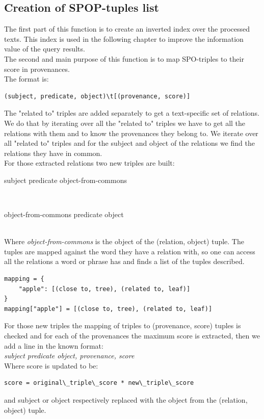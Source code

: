 \subsection{Creation of SPOP-tuples list}
\label{sec:relationmapping}
The first part of this function is to create an inverted index over the processed texts. This index is used in the following chapter to improve the information value of the query results.\\
The second and main purpose of this function is to map SPO-triples to their score in provenances.\\
The format is:
\begin{lstlisting}
(subject, predicate, object)\t[(provenance, score)]
\end{lstlisting}
The "related to" triples are added separately to get a text-specific set of relations. We do that by iterating over all the "related to" triples we have to get all the relations with them and to know the provenances they belong to. We iterate over all "related to" triples and for the subject and object of the relations we find the relations they have in common.\\
For those extracted relations two new triples are built:\\
\centerline{subject predicate object-from-commons}\\
\centerline{object-from-commons predicate object}\\
Where \textit{object-from-commons} is the object of the (relation, object) tuple. The tuples are mapped against the word they have a relation with, so one can access all the relations a word or phrase has and finds a list of the tuples described.\\
\begin{lstlisting}[caption=Example relation mapping for "apple"]
mapping = {
    "apple": [(close to, tree), (related to, leaf)]
}
mapping["apple"] = [(close to, tree), (related to, leaf)]
\end{lstlisting}
For those new triples the mapping of triples to (provenance, score) tuples is checked and for each of the provenances the maximum score is extracted, then we add a line in the known format:\\
\textit{subject predicate object, provenance, score}\\
Where score is updated to be:
\begin{lstlisting}
score = original\_triple\_score * new\_triple\_score
\end{lstlisting}
and subject or object respectively replaced with the object from the (relation, object) tuple.\\
